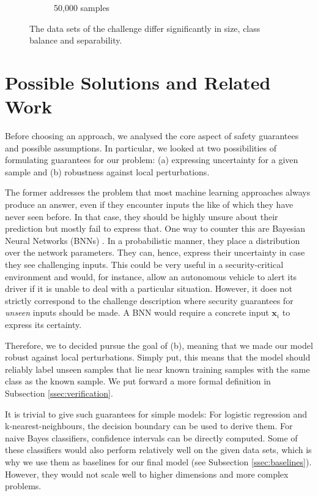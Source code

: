 \documentclass[acmsmall,nonacm]{acmart}
\begin{document}
\begin{figure}
\begin{subfigure}{.32\textwidth}
  \caption{50,000 samples}
\end{subfigure}
\caption{The data sets of the challenge differ significantly in size, class balance and separability.}
\label{fig:datasets}
\end{figure}


\section{Possible Solutions and Related Work} \label{sec:relatedWork}

Before choosing an approach, we analysed the core aspect of safety guarantees and possible assumptions. In particular, we looked at two possibilities of formulating guarantees for our problem: (a) expressing uncertainty for a given sample and (b) robustness against local perturbations. 

The former addresses the problem that most machine learning approaches always produce an answer, even if they encounter inputs the like of which they have never seen before. In that case, they should be highly unsure about their prediction but mostly fail to express that. One way to counter this are Bayesian Neural Networks (BNNs) \cite{goan2020bnn}. In a probabilistic manner, they place a distribution over the network parameters. They can, hence, express their uncertainty in case they see challenging inputs. This could be very useful in a security-critical environment and would, for instance, allow an autonomous vehicle to alert its driver if it is unable to deal with a particular situation. However, it does not strictly correspond to the challenge description where security guarantees for \textit{unseen} inputs should be made. A BNN would require a concrete input $\mathbf{x}_i$ to express its certainty.

Therefore, we to decided pursue the goal of (b), meaning that we made our model robust against local perturbations. Simply put, this means that the model should reliably label unseen samples that lie near known training samples with the same class as the known sample. We put forward a more formal definition in Subsection \ref{ssec:verification}. 

It is trivial to give such guarantees for simple models: For logistic regression and k-nearest-neighbours, the decision boundary can be used to derive them. For naive Bayes classifiers, confidence intervals can be directly computed. Some of these classifiers would also perform relatively well on the given data sets, which is why we use them as baselines for our final model (see Subsection \ref{ssec:baselines}). However, they would not scale well to higher dimensions and more complex problems. 
\end{document}
